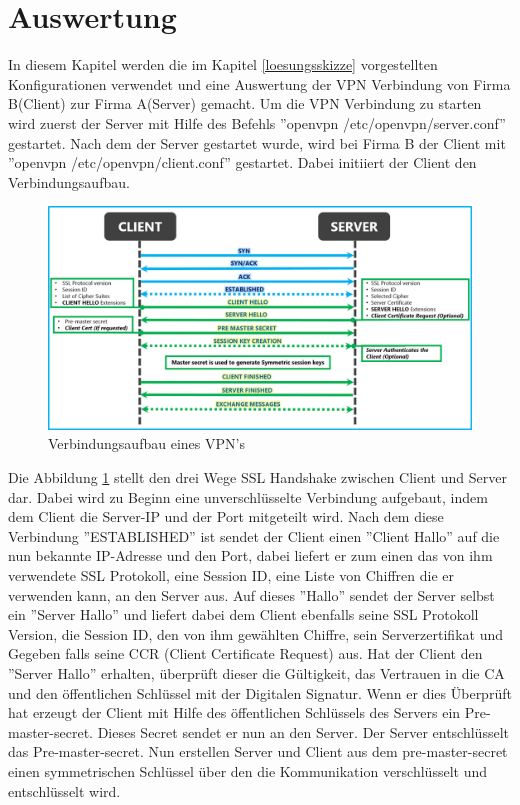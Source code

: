 \section{Auswertung}
In diesem Kapitel werden die im Kapitel \ref{loesungsskizze} vorgestellten Konfigurationen verwendet und eine Auswertung der VPN Verbindung von Firma B(Client) zur Firma A(Server) gemacht.\newline
Um die VPN Verbindung zu starten wird zuerst der Server mit Hilfe des Befehls ''openvpn /etc/openvpn/server.conf'' gestartet. Nach dem der Server gestartet wurde, wird bei Firma B der Client mit ''openvpn /etc/openvpn/client.conf'' gestartet. Dabei initiiert der Client den Verbindungsaufbau. 
\begin{figure}[h]
	\includegraphics[width=\textwidth]{pictures/vpnVerbindungsaufbau.png}
	\caption{Verbindungsaufbau eines VPN's\cite{vanRijn2018May}}
	\label{fig:SSlhand}
\end{figure}
Die Abbildung \ref{fig:SSlhand} stellt den drei Wege SSL Handshake zwischen Client und Server dar. Dabei wird zu Beginn eine unverschlüsselte Verbindung aufgebaut, indem dem Client die Server-IP und der Port mitgeteilt wird. Nach dem diese Verbindung ''ESTABLISHED'' ist sendet der Client einen ''Client Hallo'' auf die nun bekannte IP-Adresse und den Port, dabei liefert er zum einen das von ihm verwendete SSL Protokoll, eine Session ID, eine Liste von Chiffren die er verwenden kann, an den Server aus. Auf dieses ''Hallo'' sendet der Server selbst ein ''Server Hallo'' und liefert dabei dem Client ebenfalls seine SSL Protokoll Version, die Session ID, den von ihm gewählten Chiffre, sein Serverzertifikat und Gegeben falls seine CCR (Client Certificate Request) aus. Hat der Client den ''Server Hallo'' erhalten, überprüft dieser die Gültigkeit, das Vertrauen in die CA und den öffentlichen Schlüssel mit der Digitalen Signatur. Wenn er dies Überprüft hat erzeugt der Client mit Hilfe des öffentlichen Schlüssels des Servers ein Pre-master-secret. Dieses Secret sendet er nun an den Server. Der Server entschlüsselt das Pre-master-secret. Nun erstellen Server und Client aus dem pre-master-secret einen symmetrischen Schlüssel über den die Kommunikation verschlüsselt und entschlüsselt wird.\newline
